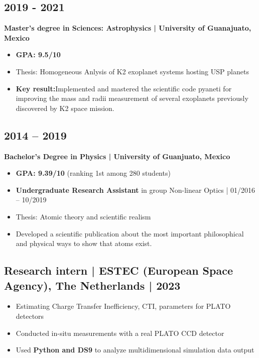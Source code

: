 \documentclass[11pt,a4paper]{article}
\begin{document}
\begin{multicols}{2}
		\subsection{2019 - 2021}
		\textbf{Master's degree in Sciences: Astrophysics | University of Guanajuato, Mexico}
		\begin{itemize}
		\item \textbf{GPA: 9.5/10}
		\item Thesis: Homogeneous Anlysis of K2 exoplanet systems hosting USP planets
		\item \textbf{Key result:}Implemented and mastered the scientific code pyaneti for improving the mass and radii measurement of several exoplanets previously discovered by K2 space mission. 
		\end{itemize}
		
		\subsection{2014 – 2019}
		\textbf{Bachelor's Degree in Physics | University of Guanjuato, Mexico}
		\begin{itemize}
			\item \textbf{GPA: 9.39/10} (ranking 1st among 280 students)
			\item \textbf{Undergraduate Research Assistant} in group Non-linear Optics | 01/2016 – 10/2019
			\item Thesis: Atomic theory and scientific realism
			\item Developed a scientific publication about the most important philosophical and physical ways to show that atoms exist. 
		\end{itemize}
		
		\subsection{Research intern | ESTEC (European Space Agency), The Netherlands | 2023}
		\begin{itemize}
			\item Estimating Charge Transfer Inefficiency, CTI, parameters for PLATO detectors
			\item Conducted in-situ measurements with a real PLATO CCD detector
			\item Used \textbf{Python and DS9} to analyze multidimensional simulation data output
		\end{itemize}
		
	\end{multicols}
	
\end{document}

